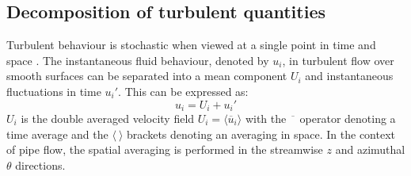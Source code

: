 \subsection{Decomposition of turbulent quantities}\label{subsec: decomposition of turbulent quantities}
Turbulent behaviour is stochastic when viewed at a single point in time and space \citep{tennekesFirstCourseTurbulence1972, popeTurbulentFlows2015}.
The instantaneous fluid behaviour, denoted by $u_i$, in turbulent flow over smooth surfaces can be separated into a mean component $U_i$ and instantaneous fluctuations in time $u_i'$.
This can be expressed as:
\begin{equation}
     u_{i} = U_i + u_i' 
\end{equation}
$U_i$ is the double averaged velocity field $U_i = \langle \overline{u}_i \rangle$ with the $\overline{\phantom{u}}$ operator denoting a time average and the $\langle \ \rangle$ brackets denoting an averaging in space.
In the context of pipe flow, the spatial averaging is performed in the streamwise $z$ and azimuthal $\theta$ directions.
